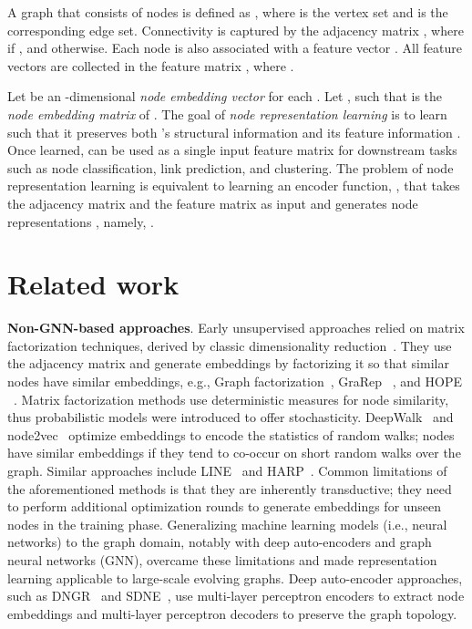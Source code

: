 \documentclass{article}
\begin{document}
A graph  that consists of  nodes is defined as , where  is the vertex set and  is the corresponding edge set. Connectivity is captured by the  adjacency matrix , where  if , and  otherwise. Each node  is also associated with a feature vector . All feature vectors are collected in the feature matrix , where . 




Let  be an -dimensional \emph{node embedding vector} for each .
Let , such that  is the \emph{node embedding matrix} of .
The goal of \emph{node representation learning} is to learn  such that it preserves both 's structural information  and its feature information . Once learned,  can be used as a single input feature matrix for downstream tasks such as node classification, link prediction, and clustering.
The problem of node representation learning is equivalent to learning an encoder function, , that takes the adjacency matrix  and the feature matrix  as input and generates node representations  , namely, . 


\section{Related work}




\textbf{Non-GNN-based approaches}. Early unsupervised  approaches relied on matrix factorization techniques, derived by classic dimensionality reduction~\cite{belkin2003laplacian}. They use the adjacency matrix and generate embeddings by factorizing it so that similar nodes have similar embeddings, e.g., Graph factorization~\cite{ ahmed2013distributed}, GraRep ~\cite{cao2015grarep}, and HOPE ~\cite{ou2016asymmetric}.
Matrix factorization methods use deterministic measures for node similarity, thus probabilistic models were introduced to offer stochasticity. DeepWalk~\cite{perozzi2014deepwalk} and node2vec~\cite{grover2016node2vec}  optimize embeddings to encode the statistics of random walks; nodes have similar embeddings if they tend to co-occur on short random walks over the graph. Similar approaches include LINE~\cite{ tang2015line} and HARP~\cite{chen2018harp}. 
Common limitations of the aforementioned methods is that they are inherently transductive; they need to perform additional optimization rounds to generate embeddings for unseen nodes in the training phase. Generalizing machine learning models (i.e., neural networks) to the graph domain, notably with deep auto-encoders and graph neural networks (GNN), overcame these limitations and made representation learning applicable to large-scale evolving graphs. 
Deep auto-encoder approaches, such as DNGR~\cite{cao2016deep} and SDNE~\cite{wang2016structural}, use multi-layer perceptron encoders to extract node embeddings and multi-layer perceptron decoders to preserve the graph topology.
\end{document}

